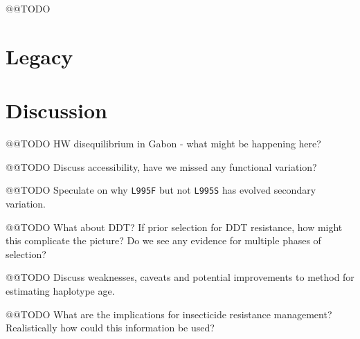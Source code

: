 \documentclass[a4paper,11pt,abstracton,hidelinks]{scrartcl}
\begin{document}
@@TODO


\section*{Legacy}











\section*{Discussion}


@@TODO HW disequilibrium in Gabon - what might be happening here?

@@TODO Discuss accessibility, have we missed any functional variation?

@@TODO Speculate on why \texttt{L995F} but not \texttt{L995S} has evolved secondary variation.

@@TODO What about DDT? If prior selection for DDT resistance, how might this complicate the picture? Do we see any evidence for multiple phases of selection?

@@TODO Discuss weaknesses, caveats and potential improvements to method for estimating haplotype age.

@@TODO What are the implications for insecticide resistance management? Realistically how could this information be used?


\end{document}
